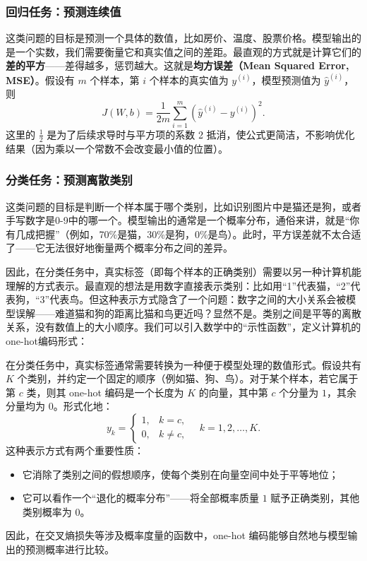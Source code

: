 \documentclass[lang=cn,zihao=-4,a4paper,fontset=windows]{beautybook}
\begin{document}
\subsubsection{回归任务：预测连续值}
这类问题的目标是预测一个具体的数值，比如房价、温度、股票价格。模型输出的是一个实数，我们需要衡量它和真实值之间的差距。最直观的方式就是计算它们的\textbf{差的平方}——差得越多，惩罚越大。这就是\textbf{均方误差（Mean Squared Error, MSE）}。假设有 $m$ 个样本，第 $i$ 个样本的真实值为 $y^{(i)}$，模型预测值为 $\hat{y}^{(i)}$，则
    \[
    J(W,b) = \frac{1}{2m} \sum_{i=1}^{m} (\hat{y}^{(i)} - y^{(i)})^2.
    \]
这里的 $\frac{1}{2}$ 是为了后续求导时与平方项的系数 2 抵消，使公式更简洁，不影响优化结果（因为乘以一个常数不会改变最小值的位置）。

\subsubsection{分类任务：预测离散类别}
这类问题的目标是判断一个样本属于哪个类别，比如识别图片中是猫还是狗，或者手写数字是0-9中的哪一个。模型输出的通常是一个概率分布，通俗来讲，就是“你有几成把握”（例如，70\%是猫，30\%是狗，0\%是鸟）。此时，平方误差就不太合适了——它无法很好地衡量两个概率分布之间的差异。

因此，在分类任务中，真实标签（即每个样本的正确类别）需要以另一种计算机能理解的方式表示。最直观的想法是用数字直接表示类别：比如用“1”代表猫，“2”代表狗，“3”代表鸟。但这种表示方式隐含了一个问题：数字之间的大小关系会被模型误解——难道猫和狗的距离比猫和鸟更近吗？显然不是。类别之间是平等的离散关系，没有数值上的大小顺序。我们可以引入数学中的“示性函数”，定义计算机的one-hot编码形式：
\begin{definition}
在分类任务中，真实标签通常需要转换为一种便于模型处理的数值形式。假设共有 $K$ 个类别，并约定一个固定的顺序（例如猫、狗、鸟）。对于某个样本，若它属于第 $c$ 类，则其 one-hot 编码是一个长度为 $K$ 的向量，其中第 $c$ 个分量为 $1$，其余分量均为 $0$。形式化地：
\[y_k = \begin{cases}
1, & k = c,\\
0, & k \neq c,
\end{cases}\quad k = 1,2,\dots,K.
\]
这种表示方式有两个重要性质：
\begin{itemize}
    \item 它消除了类别之间的假想顺序，使每个类别在向量空间中处于平等地位；
    \item 它可以看作一个“退化的概率分布”——将全部概率质量 $1$ 赋予正确类别，其他类别概率为 $0$。
\end{itemize}
因此，在交叉熵损失等涉及概率度量的函数中，one-hot 编码能够自然地与模型输出的预测概率进行比较。
\end{definition}
\end{document}
